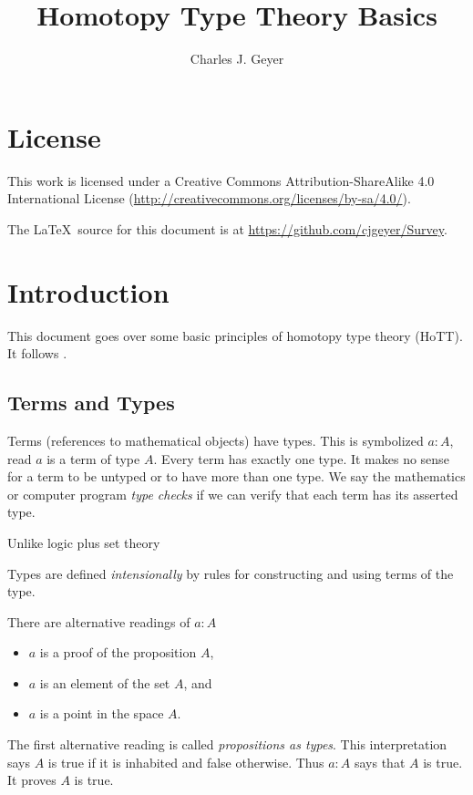 \documentclass[11pt]{article}
\begin{document}
\title{Homotopy Type Theory Basics}
\author{Charles J. Geyer}
\maketitle

\section{License}

This work is licensed under a Creative Commons
Attribution-ShareAlike 4.0 International License
(\url{http://creativecommons.org/licenses/by-sa/4.0/}).

The \LaTeX\ source for this document is
at \url{https://github.com/cjgeyer/Survey}.

\section{Introduction}

This document goes over some basic principles of homotopy type theory (HoTT).
It follows \citet[hereinafter referred to as the HoTT book]{hott-book}.

\subsection{Terms and Types}

Terms (references to mathematical objects) have types.  This is symbolized
$a : A$, read $a$ is a term of type $A$.
Every term has exactly one type.  It makes no sense for a term to
be untyped or to have more than one type.  We say the mathematics or computer
program \emph{type checks} if we can verify that each term has its asserted
type.

Unlike logic plus set theory

Types are defined
\emph{intensionally} by rules for constructing and using terms of the type.

There are alternative readings of $a : A$
\begin{itemize}
\item $a$ is a proof of the proposition $A$,
\item $a$ is an element of the set $A$, and
\item $a$ is a point in the space $A$.
\end{itemize}

The first alternative reading is called \emph{propositions as types}.
This interpretation says $A$ is true if it is inhabited and false otherwise.
Thus $a : A$ says that $A$ is true.  It proves $A$ is true.
\end{document}
